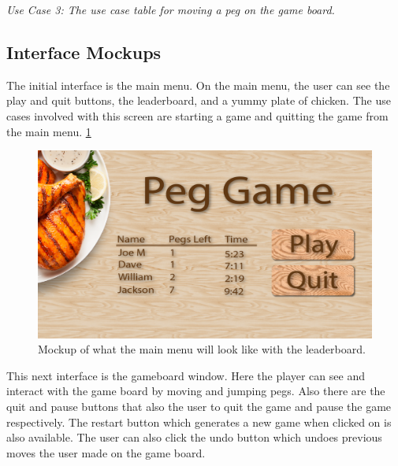 \documentclass[10pt,conference,onecolumn,compsoc]{IEEEtran}
\begin{document}
\textit{Use Case 3: The use case table for moving a peg on the game board.} \newline


\subsection{Interface Mockups}

The initial interface is the main menu. On the main menu, the user can see the play and quit buttons, the leaderboard, and a yummy plate of chicken. The use cases involved with this screen are starting a game and quitting the game from the main menu. \ref{fig:board-main}

\begin{figure}[H]
    \begin{center}
        \includegraphics[scale=0.15]{main-menu.png}
        \caption{Mockup of what the main menu will look like with the leaderboard.}
        \label{fig:board-main}
    \end{center}
\end{figure}

This next interface is the gameboard window. Here the player can see and interact with the game board by moving and jumping pegs. Also there are the quit and pause buttons that also the user to quit the game and pause the game respectively. The restart button which generates a new game when clicked on is also available. The user can also click the undo button which undoes previous moves the user made on the game board.
\end{document}
